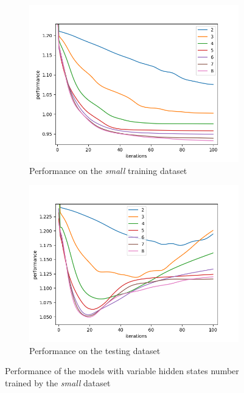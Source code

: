 \documentclass[thesis=M,english]{FITthesis}[2012/10/20]
\begin{document}
\begin{itemize}
\begin{figure}
\centering
\begin{subfigure}{.8\textwidth}
  \centering
  \includegraphics[width=1\linewidth]{img/ex5/train_small.png}
  \caption{Performance on the \textit{small} training dataset}
  \label{fig:smtrain}
\end{subfigure}
\begin{subfigure}{.8\textwidth}
  \centering
  \includegraphics[width=1\linewidth]{img/ex5/test_small.png}
  \caption{Performance on the testing dataset}
  \label{fig:smtest}
\end{subfigure}
\caption{Performance of the models with variable hidden states number trained by the \textit{small} dataset}
\label{fig:sm}
\end{figure}


\end{itemize}
\end{document}
